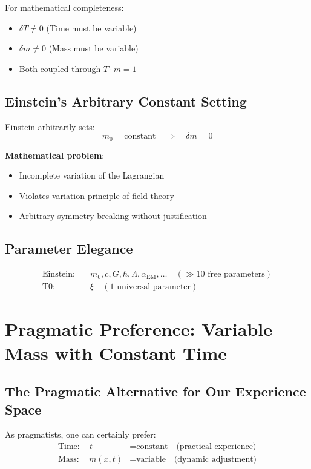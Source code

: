 \documentclass[12pt,a4paper]{article}
\newcommand{\xipar}{\xi}
\theoremstyle{definition}
\theoremstyle{remark}
\begin{document}
	For mathematical completeness:
	\begin{itemize}
		\item $\delta T \neq 0$ (Time must be variable)
		\item $\delta m \neq 0$ (Mass must be variable)
		\item Both coupled through $T \cdot m = 1$
	\end{itemize}
	
	\subsection{Einstein's Arbitrary Constant Setting}
	
	Einstein arbitrarily sets:
	\begin{equation}
		m_0 = \text{constant} \quad \Rightarrow \quad \delta m = 0
	\end{equation}
	
	\textbf{Mathematical problem}:
	\begin{itemize}
		\item Incomplete variation of the Lagrangian
		\item Violates variation principle of field theory
		\item Arbitrary symmetry breaking without justification
	\end{itemize}
	
	\subsection{Parameter Elegance}
	
	\begin{align}
		\text{Einstein}: \quad &m_0, c, G, \hbar, \Lambda, \alpha_{\text{EM}}, \ldots \quad (\gg 10 \text{ free parameters}) \\
		\text{T0}: \quad &\xipar \quad (1 \text{ universal parameter})
	\end{align}
	
	\section{Pragmatic Preference: Variable Mass with Constant Time}
	
	\subsection{The Pragmatic Alternative for Our Experience Space}
	
	As pragmatists, one can certainly prefer:
	\begin{align}
		\text{Time}: \quad t &= \text{constant} \quad \text{(practical experience)} \\
		\text{Mass}: \quad m(x,t) &= \text{variable} \quad \text{(dynamic adjustment)}
	\end{align}
	
\end{document}
